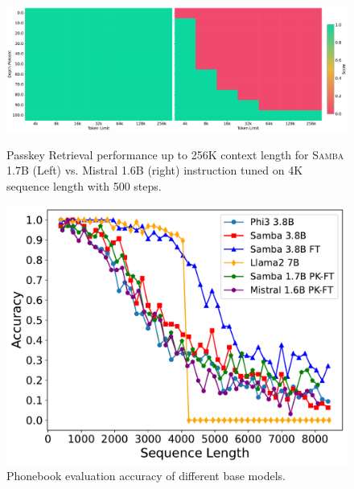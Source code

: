 \documentclass{article}
\begin{document}
\begin{figure}[!htbp]
    \centering
    \begin{minipage}{.55\textwidth}
      \raggedleft
      \includegraphics[width=\linewidth]{combined_heatmap.pdf}
      \caption{Passkey Retrieval performance up to 256K context length for \textsc{Samba} 1.7B (Left) vs. Mistral 1.6B (right) instruction tuned on 4K sequence length with 500 steps.}
      \label{fig:pk}
    \end{minipage}%
    \hfill
    \begin{minipage}{.4\textwidth}
      \raggedright
      \includegraphics[width=\linewidth]{Phonebook.pdf}
      \caption{Phonebook evaluation accuracy of different base models.}
      \label{fig:pb}
    \end{minipage}
    \vspace{-0.3cm}
\end{figure}
\end{document}
